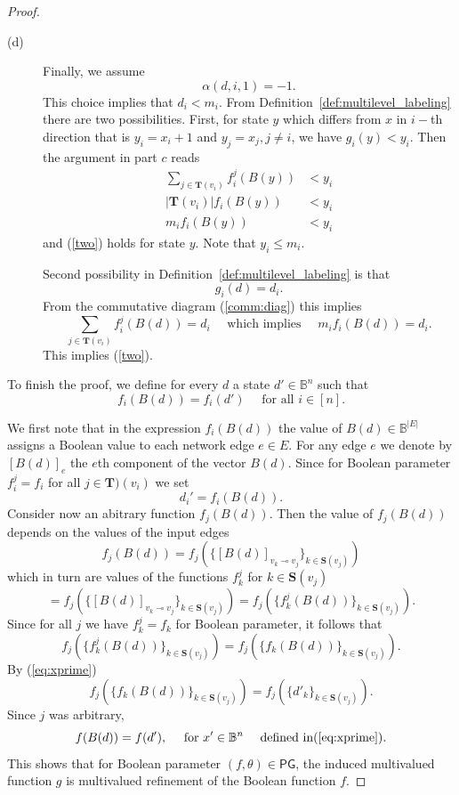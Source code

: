 \documentclass[12pt, notitlepage]{amsart}
\theoremstyle{definition}
\newcommand{\Targets}{\mathbf{T}}
\newcommand{\Sources}{\mathbf{S}}
\newcommand{\PG}{\mathsf{PG}}
\newcommand{\bbB}{\mathbb{B}}
\begin{document}
\begin{proof}
\begin{description}
      \item[(d)] Finally, we assume
        \[ \alpha(d, i, 1) = -1.\]
        This choice implies that  $d_i <m_i $.
        From Definition~\ref{def:multilevel_labeling}
        there are two possibilities.
        First, for state $y$ which differs from $x$ in $i-$th direction that is $y_i= x_i+1$ and $ y_j=x_j, j\not = i$, we have $g_i(y) <y_i$.
        Then the argument in part $c$ reads
        \begin{align*}
          \sum_{j \in \Targets(v_i)} f_i^j(B(y))& <y_i \\
          |\Targets(v_i)|f_i(B(y))& <y_i \\
          m_i f_i(B(y))& <y_i
        \end{align*}
        and  (\ref{two}) holds for state $y$. Note that $y_i \leq m_i$.

        Second possibility in Definition~\ref{def:multilevel_labeling}  is that
        \[ g_i(d) =d_i.\]
        From the commutative diagram (\ref{comm:diag}) this implies
        \[
          \sum_{j \in \Targets(v_i)} f_i^j(B(d)) =d_i \quad \mbox{ which implies } \quad
        m_i f_i(B(d)) =d_i .\]
        This implies (\ref{two}).
    \end{description}

    To finish the proof, we define for every $d$ a state $d' \in \bbB^n$ such that
    \[ f_i(B(d)) = f_i(d') \quad \mbox{ for all } i \in [n].\]

  We first note that in the expression  $f_i(B(d))$ the  value of $B(d) \in \bbB^{|E|}$ assigns a Boolean value to each network edge $e \in E$. For any edge $e$ we denote by $[B(d)]_e$ the $e$th component of the vector $B(d)$. Since for Boolean parameter $f_i^j=f_i$ for all $j \in \Targets)(v_i)$ we set
  \begin{equation} \label{eq:xprime}
    d_i' = f_i(B(d)).
  \end{equation}
  Consider now an abitrary function $f_j(B(d))$. Then the value of $f_j(B(d))$ depends on the values of the input edges
  \[ f_j(B(d)) =f_j(\{ [B(d)]_{v_k \multimap v_j}\}_{k\in \Sources(v_j)}) \]
  which in turn are values of the functions $f_k^j$ for $k \in \Sources(v_j)$
  \[ =f_j(\{ [B(d)]_{v_k \multimap v_j}\}_{k\in \Sources(v_j)})= f_j(\{ f_k^j(B(d))\}_{k\in \Sources(v_j)}) .\]
  Since for all $j$ we have $f_k^j=f_k$ for Boolean parameter, it follows that
  \[ f_j(\{ f_k^j(B(d))\}_{k\in \Sources(v_j)}) = f_j(\{f_k(B(d))\}_{k\in \Sources(v_j)}).\]
  By (\ref{eq:xprime})
  \[  f_j(\{f_k(B(d))\}_{k\in \Sources(v_j)})= f_j(\{d'_k\}_{k\in \Sources(v_j)}). \]
  Since $j$ was arbitrary,
  \[ f(B(d)) = f(d'), \quad \mbox{ for } x'\in \bbB^n \quad \mbox{ defined in} (\ref{eq:xprime}).\]
  This shows that for Boolean parameter $(f,\theta) \in \PG$, the induced multivalued function $g$ is multivalued refinement of the Boolean function $f$.
\end{proof}
\end{document}
